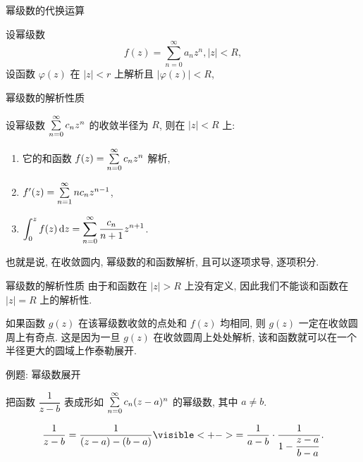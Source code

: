 \begin{frame}{幂级数的代换运算}
	\onslide<+->
	\begin{theorem}
		设幂级数
		\[f(z)=\sum_{n=0}^\infty a_nz^n,|z|<R,\]
		设函数 $\varphi(z)$ 在 $|z|<r$ 上解析且 $|\varphi(z)|<R$, 
		\onslide<+->{那么当 $|z|<r$ 时,
		\[f[\varphi(z)]=\sum_{n=0}^\infty a_n[\varphi(z)]^n.\]}
	\end{theorem}
\end{frame}


\begin{frame}{幂级数的解析性质}
	\onslide<+->
	\begin{theorem}
		设幂级数 $\sum\limits_{n=0}^\infty c_nz^n$ 的收敛半径为 $R$, 则在 $|z|<R$ 上:
		\begin{enumerate}
			\item 它的和函数 $f(z)=\sum\limits_{n=0}^\infty c_nz^n$ 解析,
			\item $f'(z)=\sum\limits_{n=1}^\infty nc_nz^{n-1}$,
			\item $\displaystyle\int_0^zf(z)\,\mathrm{d} z=\sum_{n=0}^\infty \frac{c_n}{n+1}z^{n+1}$.
		\end{enumerate}
	\end{theorem}

	\onslide<+->
	也就是说, \alert{在收敛圆内, 幂级数的和函数解析, 且可以逐项求导, 逐项积分}.
\end{frame}


\begin{frame}{幂级数的解析性质}
	\onslide<+->
	由于和函数在 $|z|>R$ 上没有定义, 因此我们不能谈和函数在 $|z|=R$ 上的解析性.

	\onslide<+->
	如果函数 $g(z)$ 在该幂级数收敛的点处和 $f(z)$ 均相同, 则 $g(z)$ \alert{一定在收敛圆周上有奇点}.
	\onslide<+->
	这是因为一旦 $g(z)$ 在收敛圆周上处处解析, 该和函数就可以在一个半径更大的圆域上作泰勒展开.
\end{frame}


\begin{frame}{例题: 幂级数展开}
	\onslide<+->
	\begin{example}
		把函数 $\dfrac1{z-b}$ 表成形如 $\sum\limits_{n=0}^\infty c_n(z-a)^n$ 的幂级数, 其中 $a\neq b$.
	\end{example}

	\onslide<+->
	\begin{solution}
		\[\frac1{z-b}=\frac1{(z-a)-(b-a)}
		\visible<+->{=\frac1{a-b}\cdot\frac1{1-\dfrac{z-a}{b-a}}.}\]
		\onslide<+->{即
		\[\frac1{z-b}=-\sum_{n=0}^\infty\frac{(z-a)^n}{(b-a)^{n+1}},\quad|z-a|<|b-a|.\]}
	\end{solution}
\end{frame}


